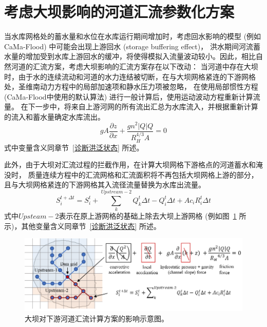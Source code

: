 \section{考虑大坝影响的河道汇流参数化方案}
当水库网格处的蓄水量和水位在水库运行期间增加时，考虑回水影响的模型 (例如CaMa-Flood) 中可能会出现上游回水 (storage buffering effect)，
洪水期间河流蓄水量的增加受到水库上游回水的缓冲，将使得模拟入流量波动较小。因此，相比自然河道的汇流方案，考虑大坝影响的汇流方案存在以下改动：
当河道中存在大坝时，由于水的连续流动和河道的水力连结被切断，在与大坝网格紧连的下游网格处，圣维南动力方程中的局部加速项和静水压力项被忽略，
在使用局部惯性方程 (CaMa-Flood中使用的默认算法) 进行一般计算后，使用运动波动方程重新计算流量。
在下一步中，将来自上游河网的所有流出汇总为水库流入，并根据重新计算的流入和蓄水量确定水库流出。
\begin{equation}
g A \frac{\partial z}{\partial x}+\frac{g n^{2}|Q| Q}{R_{H}^{4 / 3} A}=0
\end{equation}
式中变量含义同章节~\ref{诊断洪泛状态} 所述。


此外，由于大坝对汇流过程的拦截作用，在计算大坝网格下游格点的河道蓄水和淹没时，
质量连续方程中的汇流网格和汇流面积将不再包括大坝网格上游的部分，
且与大坝网格紧连的下游网格其入流径流量替换为水库出流量。
\begin{equation}
S_{i}^{t+\Delta t}=S_{i}^{t}+\sum_{k}^{Upstream-2} Q_{k}^{t} \Delta t-Q_{i}^{t} \Delta t+A c_{i} R_{i}^{t} \Delta t
\end{equation}
式中$Upsteam-2$表示在原上游网格的基础上除去大坝上游网格 (例如图~\ref{fig:大坝对下游河道汇流计算方案的影响示意图} 所示)，其他变量含义同章节~\ref{诊断洪泛状态} 所述。

{
\begin{figure}[]
\centering
\includegraphics{Figures/陆地表面的水分循环/大坝对下游河道汇流计算方案的影响示意图.png}
\caption{大坝对下游河道汇流计算方案的影响示意图。}
\label{fig:大坝对下游河道汇流计算方案的影响示意图}
\end{figure}
}
